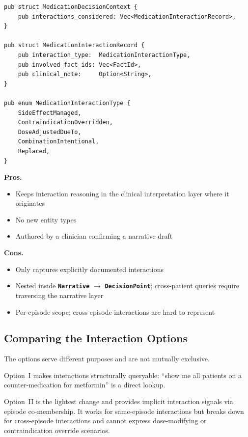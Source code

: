 \documentclass[11pt]{article}
\newcommand{\entity}[1]{\texttt{\textbf{#1}}}
\newenvironment{prosbox}{%
  \begin{mdframed}[backgroundcolor=notegreen,
    linecolor=noteborder, linewidth=1pt,
    innertopmargin=8pt, innerbottommargin=8pt,
    innerleftmargin=10pt, innerrightmargin=10pt]
  \small
}{%
  \end{mdframed}
}
\newenvironment{consbox}{%
  \begin{mdframed}[backgroundcolor=warningyellow,
    linecolor=warningborder, linewidth=1pt,
    innertopmargin=8pt, innerbottommargin=8pt,
    innerleftmargin=10pt, innerrightmargin=10pt]
  \small
}{%
  \end{mdframed}
}
\begin{document}
\begin{lstlisting}
pub struct MedicationDecisionContext {
    pub interactions_considered: Vec<MedicationInteractionRecord>,
}

pub struct MedicationInteractionRecord {
    pub interaction_type:  MedicationInteractionType,
    pub involved_fact_ids: Vec<FactId>,
    pub clinical_note:     Option<String>,
}

pub enum MedicationInteractionType {
    SideEffectManaged,
    ContraindicationOverridden,
    DoseAdjustedDueTo,
    CombinationIntentional,
    Replaced,
}
\end{lstlisting}

\begin{prosbox}
\textbf{Pros.}
\begin{itemize}[noitemsep]
  \item Keeps interaction reasoning in the clinical interpretation layer
    where it originates
  \item No new entity types
  \item Authored by a clinician confirming a narrative draft
\end{itemize}
\end{prosbox}

\begin{consbox}
\textbf{Cons.}
\begin{itemize}[noitemsep]
  \item Only captures explicitly documented interactions
  \item Nested inside \entity{Narrative} $\to$ \entity{DecisionPoint};
    cross-patient queries require traversing the narrative layer
  \item Per-episode scope; cross-episode interactions are hard to
    represent
\end{itemize}
\end{consbox}

\subsection{Comparing the Interaction Options}

The options serve different purposes and are not mutually exclusive.

Option~I makes interactions structurally queryable: ``show me all
patients on a counter-medication for metformin'' is a direct lookup.

Option~II is the lightest change and provides implicit interaction
signals via episode co-membership. It works for same-episode
interactions but breaks down for cross-episode interactions and cannot
express dose-modifying or contraindication override scenarios.
\end{document}
